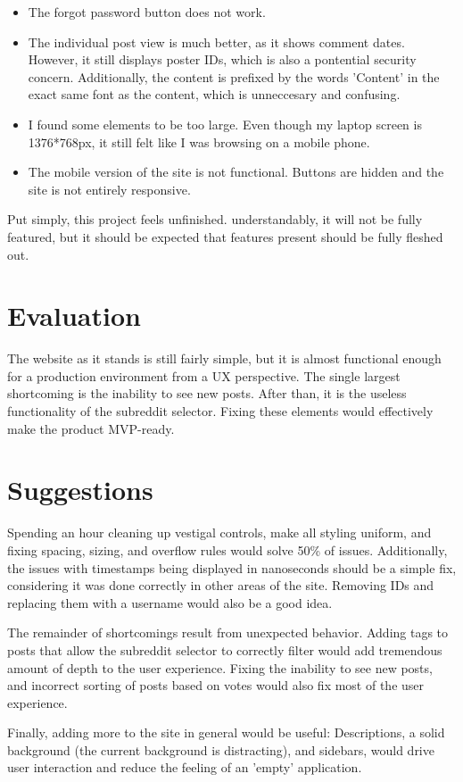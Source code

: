 \begin{itemize}
    \item The forgot password button does not work.
    \item The individual post view is much better, as it shows comment dates. However, it still displays poster IDs, which is also a pontential security concern. Additionally, the content is prefixed by the words 'Content' in the exact same font as the content, which is unneccesary and confusing.
    \item I found some elements to be too large. Even though my laptop screen is 1376*768px, it still felt like I was browsing on a mobile phone.
    \item The mobile version of the site is not functional. Buttons are hidden and the site is not entirely responsive.
\end{itemize}

Put simply, this project feels unfinished. understandably, it will not be fully featured, but it should be expected that features present should be fully fleshed out.

\section{Evaluation}

The website as it stands is still fairly simple, but it is almost functional enough for a production environment from a UX perspective. The single largest shortcoming is the inability to see new posts. After than, it is the useless functionality of the subreddit selector. Fixing these elements would effectively make the product MVP-ready.

\section{Suggestions}
Spending an hour cleaning up vestigal controls, make all styling uniform, and fixing spacing, sizing, and overflow rules would solve 50\% of issues. Additionally, the issues with timestamps being displayed in nanoseconds should be a simple fix, considering it was done correctly in other areas of the site. Removing IDs and replacing them with a username would also be a good idea.

The remainder of shortcomings result from unexpected behavior. Adding tags to posts that allow the subreddit selector to correctly filter would add tremendous amount of depth to the user experience. Fixing the inability to see new posts, and incorrect sorting of posts based on votes would also fix most of the user experience.

Finally, adding more to the site in general would be useful: Descriptions, a solid background (the current background is distracting), and sidebars, would drive  user interaction and reduce the feeling of an 'empty' application.